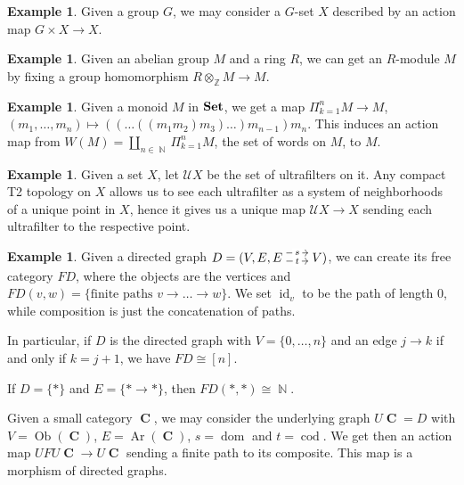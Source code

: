 \documentclass[a4paper,11pt,fullpage,oneside,openany]{amsbook}
\newcommand{\catname}[1]{{\normalfont\textbf{#1}}}
\newcommand{\Set}{\catname{Set}}
\DeclareMathOperator{\C}{\mathbf{C}}
\DeclareMathOperator{\N}{\mathbb{N}}
\DeclareMathOperator{\Z}{\mathbb{Z}}
\DeclareMathOperator{\id}{id}
\DeclareMathOperator{\dom}{dom}
\DeclareMathOperator{\cod}{cod}
\DeclareMathOperator{\Ob}{Ob}
\DeclareMathOperator{\Ar}{Ar}
\theoremstyle{definition}
\theoremstyle{definition}
\newtheorem{exmp}[thm]{Example} %
\theoremstyle{remark}
\begin{document}
	\begin{exmp}
		Given a group $G$, we may consider a $G$-set $X$ described by an action map $G\times X\rightarrow X$.
	\end{exmp}
	\begin{exmp}
		Given an abelian group $M$ and a ring $R$, we can get an $R$-module $M$ by fixing a group homomorphism $R\otimes_{\Z} M\rightarrow M$.
	\end{exmp}
	\begin{exmp}
		Given a monoid $M$ in $\Set$, we get a map $\Pi_{k=1}^n M\rightarrow M$, $(m_1,\ldots,m_n)\mapsto ((\ldots ((m_1m_2)m_3)\ldots )m_{n-1}) m_n$. This induces an action map from $W(M)=\amalg_{n\in\N}\Pi_{k=1}^n M$, the set of words on $M$, to $M$.
	\end{exmp}
	\begin{exmp}\label{ultrafilters}
		Given a set $X$, let $\mathcal{U}X$ be the set of ultrafilters on it. Any compact T2 topology on $X$ allows us to see each ultrafilter as a system of neighborhoods of a unique point in $X$, hence it gives us a unique map $\mathcal{U}X\rightarrow X$ sending each ultrafilter to the respective point.
	\end{exmp}
	\begin{exmp}
		Given a directed graph $D=(V,E,\hspace{-1.5mm}\begin{tikzcd}
		E\hspace{-1.5mm}\arrow[r, "t" description,  shift right=.5ex, shorten <= .3em, shorten >= .3em]  \arrow[r, "s" description, shift left=1ex, shorten <= .3em, shorten >= .3em] & \hspace{-1.5mm}V
		\end{tikzcd}\hspace{-1.5mm})$, we can create its free category $FD$, where the objects are the vertices and $FD(v,w)=\{\text{finite paths } v\rightarrow\ldots\rightarrow w\}$. We set $\id_v$ to be the path of length 0, while composition is just the concatenation of paths.
		
		In particular, if $D$ is the directed graph with $V=\{0,\ldots,n\}$ and an edge $j\rightarrow k$ if and only if $k=j+1$, we have $FD\cong [n]$.
		
		If $D=\{*\}$ and $E=\{*\rightarrow *\}$, then $FD(*,*)\cong\N$.
		
		Given a small category $\C$, we may consider the underlying graph $U\C=D$ with $V=\Ob(\C)$, $E=\Ar(\C)$, $s=\dom$ and $t=\cod$. We get then an action map $UFU\C\rightarrow U\C$ sending a finite path to its composite. This map is a morphism of directed graphs.
	\end{exmp}
\end{document}

